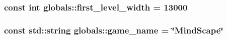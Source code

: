 \subsubsection[{\texorpdfstring{first\+\_\+level\+\_\+width}{first_level_width}}]{\setlength{\rightskip}{0pt plus 5cm}const int globals\+::first\+\_\+level\+\_\+width = 13000}\hypertarget{namespaceglobals_aff85724c05eca0ef84299839fe8c217a}{}\label{namespaceglobals_aff85724c05eca0ef84299839fe8c217a}
\subsubsection[{\texorpdfstring{game\+\_\+name}{game_name}}]{\setlength{\rightskip}{0pt plus 5cm}const std\+::string globals\+::game\+\_\+name = \char`\"{}Mind\+Scape\char`\"{}}\hypertarget{namespaceglobals_ad52f0666ad19f6036b6b99375e76a9c1}{}\label{namespaceglobals_ad52f0666ad19f6036b6b99375e76a9c1}
